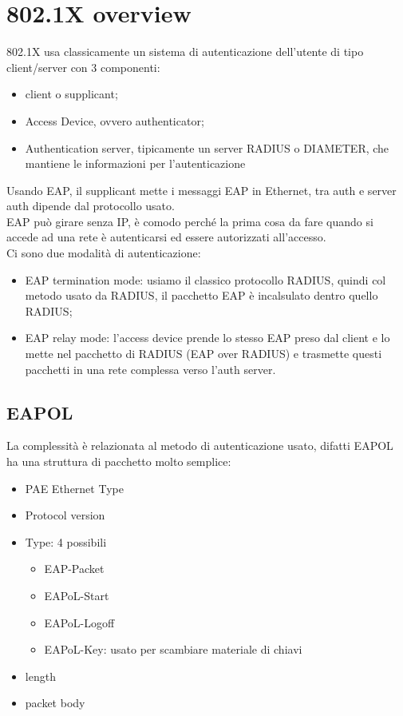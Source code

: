 \documentclass[12pt, oneside]{extbook} %
\begin{document}
\section{802.1X overview}
802.1X usa classicamente un sistema di autenticazione dell'utente di tipo client/server con 3 componenti:
    \begin{itemize}
        \item client o supplicant;
        \item Access Device, ovvero authenticator;
        \item Authentication server, tipicamente un server RADIUS o DIAMETER, che mantiene le informazioni per l'autenticazione
    \end{itemize}
Usando EAP, il supplicant mette i messaggi EAP in Ethernet, tra auth e server auth dipende dal protocollo usato.
\\EAP può girare senza IP, è comodo perché la prima cosa da fare quando si accede ad una rete è autenticarsi ed essere autorizzati all'accesso.
\\Ci sono due modalità di autenticazione:
    \begin{itemize}
        \item EAP termination mode: usiamo il classico protocollo RADIUS, quindi col metodo usato da RADIUS, il pacchetto EAP è incalsulato dentro quello RADIUS;
        \item EAP relay mode: l'access device prende lo stesso EAP preso dal client e lo mette nel pacchetto di RADIUS (EAP over RADIUS) e trasmette questi pacchetti in una rete complessa verso l'auth server.
    \end{itemize}

\subsection{EAPOL}
La complessità è relazionata al metodo di autenticazione usato, difatti EAPOL ha una struttura di pacchetto molto semplice:
    \begin{itemize}
        \item PAE Ethernet Type
        \item Protocol version
        \item Type: 4 possibili
        \begin{itemize}
            \item EAP-Packet
            \item EAPoL-Start
            \item EAPoL-Logoff
            \item EAPoL-Key: usato per scambiare materiale di chiavi
        \end{itemize}
        \item length
        \item packet body
    \end{itemize}
\end{document}
